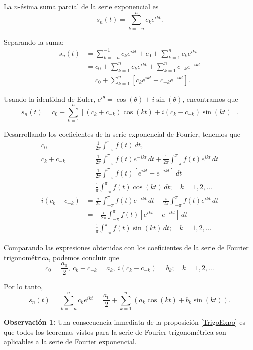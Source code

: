 \begin{demo}
La $n$-ésima suma parcial de la serie exponencial es
$$ s_n(t) = \sum_{k=-n}^n c_k e^{ikt}.$$

Separando la suma:
\begin{align*}
    s_n(t) &= \sum_{k=-n}^{-1} c_k e^{ikt} + c_0 + \sum_{k=1}^n c_k e^{ikt} \\
    &= c_0 + \sum_{k=1}^n c_k e^{ikt} + \sum_{k=1}^n c_{-k} e^{-ikt} \\
    &= c_0 + \sum_{k=1}^n [c_k e^{ikt} + c_{-k} e^{-ikt}]. 
\end{align*}

Usando la identidad de Euler, $e^{i\theta} = \cos(\theta) + i \sin(\theta)$, encontramos que
$$s_n(t) = c_0 +  \sum_{k=1}^n [(c_k + c_{-k}) \cos(kt) + i(c_k - c_{-k}) \sin(kt)].$$

Desarrollando los coeficientes de la serie exponencial de Fourier, tenemos que
\begingroup
\allowdisplaybreaks
\begin{align*}
    c_0 &= \frac{1}{2\pi} \int_{-\pi}^{\pi} f(t) \,dt, \\
    c_k + c_{-k} &= \frac{1}{2\pi} \int_{-\pi}^{\pi} f(t) e^{-ikt} \,dt + \frac{1}{2\pi} \int_{-\pi}^{\pi} f(t) e^{ikt} \,dt  \\
    &= \frac{1}{2\pi} \int_{-\pi}^{\pi} f(t) [e^{ikt} + e^{-ikt}] \,dt \\
    &= \frac{1}{\pi} \int_{-\pi}^{\pi} f(t) \cos(kt) \,dt; \quad k = 1,2, \dots\\
   i( c_k - c_{-k}) &= \frac{i}{2\pi} \int_{-\pi}^{\pi} f(t) e^{-ikt} \,dt - \frac{i}{2\pi} \int_{-\pi}^{\pi} f(t) e^{ikt} \,dt \\
   &= - \frac{i}{2\pi} \int_{-\pi}^{\pi} f(t) [e^{ikt} - e^{-ikt}] \,dt \\
   &= \frac{1}{\pi} \int_{-\pi}^{\pi} f(t) \sin(kt)\,dt; \quad k = 1,2, \dots
\end{align*}
\endgroup

Comparando las expresiones obtenidas con los coeficientes de la serie de Fourier trigonométrica, podemos concluir que 
$$c_0 = \frac{a_0}{2}, ~  c_k + c_{-k} = a_k, ~ i( c_k - c_{-k}) = b_k; \quad k = 1,2, \dots$$

Por lo tanto, 
$$ s_n(t) = \sum_{k=-n}^n c_k e^{ikt} = \frac{a_0}{2} + \sum_{k=1}^n (a_k \cos(kt) + b_k \sin(kt)).$$

\end{demo}

\textbf{Observación 1:} Una consecuencia inmediata de la proposición \ref{TrigoExpo} es que todos los teoremas vistos para la serie de Fourier trigonométrica son aplicables a la serie de Fourier exponencial.
\\

